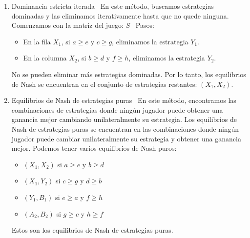 \documentclass[11pt]{article}
\begin{document}
\begin{enumerate}
    \item Dominancia estricta iterada \
    En este método, buscamos estrategias dominadas y las eliminamos iterativamente hasta que no quede ninguna. Comenzamos con la matriz del juego: $S$ \
    Pasos:
    \begin{itemize}
    \item En la fila $X_1$, si $a \geq e$ y $c \geq g$, eliminamos la estrategia $Y_1$.
    \item En la columna $X_2$, si $b \geq d$ y $f \geq h$, eliminamos la estrategia $Y_2$.
    \end{itemize}
    No se pueden eliminar más estrategias dominadas. Por lo tanto, los equilibrios de Nash se encuentran en el conjunto de estrategias restantes: $(X_1, X_2)$.
    
    \item Equilibrios de Nash de estrategias puras \
    En este método, encontramos las combinaciones de estrategias donde ningún jugador puede obtener una ganancia mejor cambiando unilateralmente su estrategia.
    Los equilibrios de Nash de estrategias puras se encuentran en las combinaciones donde ningún jugador puede cambiar unilateralmente su estrategia y obtener una ganancia mejor.
    Podemos tener varios equilibrios de Nash puros:
    \begin{itemize}
    \item $(X_1, X_2)$ si $a \geq e$ y $b \geq d$
    \item $(X_1, Y_2)$ si $c \geq g$ y $d \geq b$
    \item $(Y_1, B_1)$ si $e \geq a$ y $f \geq h$
    \item $(A_2, B_2)$ si $g \geq c$ y $h \geq f$
    \end{itemize}
    Estos son los equilibrios de Nash de estrategias puras.
    

\end{enumerate}
\end{document}
